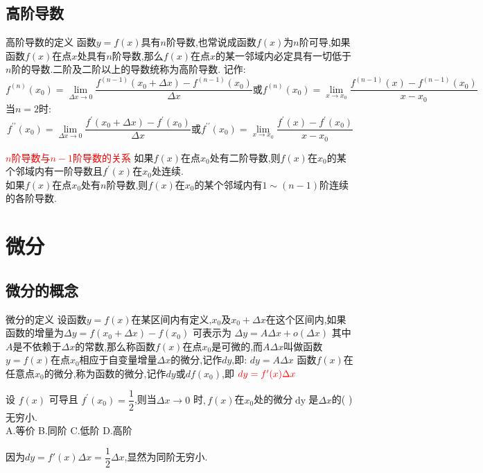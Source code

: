 \documentclass[8pt a4paper, oneside, UTF8]{ctexbook}  %
\begin{document}
\begin{sloppypar}
    \subsection{高阶导数}
    \begin{defn}{高阶导数的定义}{}
        函数$y=f(x)$具有$n$阶导数,也常说成函数$f(x)$为$n$阶可导,如果函数$f(x)$在点$x$处具有$n$阶导数,那么$f(x)$在点$x$的某一邻域内必定具有一切低于$n$阶的导数.二阶及二阶以上的导数统称为高阶导数.
        记作:
        $$
        f^{(n)}(x_0)=\lim_{\Delta x\to0}\dfrac{f^{(n-1)}(x_0+\Delta x)-f^{(n-1)}(x_0)}{\Delta x}\text{或}f^{(n)}(x_0)=\lim_{x\to x_0}\dfrac{f^{(n-1)}(x)-f^{(n-1)}(x_0)}{x-x_0}
        $$
        当$n=2$时:
        $$
        f^{\prime\prime}(x_0)=\lim_{\Delta x\to0}\dfrac{f^{\prime}(x_0+\Delta x)-f^{\prime}(x_0)}{\Delta x}\text{或}f^{\prime\prime}(x_0)=\lim_{x\to x_0}\dfrac{f^{\prime}(x)-f^{\prime}(x_0)}{x-x_0}
        $$
    \end{defn}
    \begin{corollary}{\textcolor{red}{$n$阶导数与$n-1$阶导数的关系}}{}
        如果$f(x)$在点$x_0$处有二阶导数,则$f(x)$在$x_0$的某个邻域内有一阶导数且$f^\prime(x)$在$x_0$处连续.\\
        如果$f(x)$在点$x_{0}$处有$n$阶导数,则$f(x)在x_0$的某个邻域内有$1 \sim (n-1)$阶连续的各阶导数.
    \end{corollary}
    \section{微分}
    \subsection{微分的概念}
    \begin{defn}{微分的定义}{}
        设函数$y=f(x)$在某区间内有定义,$x_0$及$x_0+\Delta x$在这个区间内,如果函数的增量为$\Delta y=f(x_{0}+\Delta x)-f(x_{0})$
        可表示为
        $   \Delta y=A\Delta x+o(\Delta x)$
        其中$A$是不依赖于$\Delta x$的常数,那么称函数$f(x)$在点$x_0$是可微的,而$A\Delta x$叫做函数$y=f(x)$在点$x_0$相应于自变量增量$\Delta x$​的微分,记作$dy$,即:
        $dy=A\Delta x$
        函数$f(x)$在任意点$x_0$的微分,称为函数的微分,记作$dy$或$df(x_0)$,即
        $\textcolor{red}{dy=f^{\prime}(x)\Delta x}$
    \end{defn}
    \begin{problem}
        设 $f(x)$ 可导且 $f^\prime(x_0)=\dfrac12$,则当$\Delta x\to0$ 时$,f(x)$在$x_0$处的微分$\operatorname{dy}$是$\Delta x$的( )无穷小.\\
        A.等价 \quad B.同阶 \quad C.低阶 \quad D.高阶
    \end{problem}
    \begin{solution}
        因为$dy=f'(x) \Delta x=\dfrac{1}{2}\Delta x$,显然为同阶无穷小.
    \end{solution}

\end{sloppypar}
\end{document}
